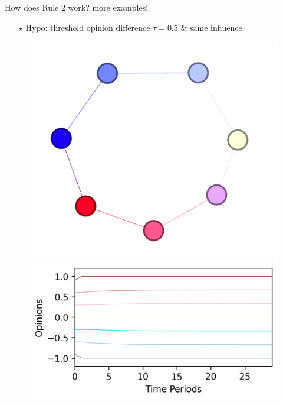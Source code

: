 \documentclass[xcolor=table]{beamer}
\begin{document}
\begin{frame}{How does Rule 2 work? more examples! }
\begin{itemize} \item[$\star$] Hypo: threshold opinion difference $\tau = 0.5$ \& same influence \end{itemize}
\begin{figure}
\centering
\begin{minipage}{.5\textwidth}
  \centering
  \includegraphics[scale = 0.55]{./img/moderate.png}
\end{minipage}%
\begin{minipage}{.5\textwidth}
  \centering
  \includegraphics[scale = 0.55]{./img/plot_moderate.jpg}
\end{minipage}
\end{figure}

\end{frame}
\end{document}
